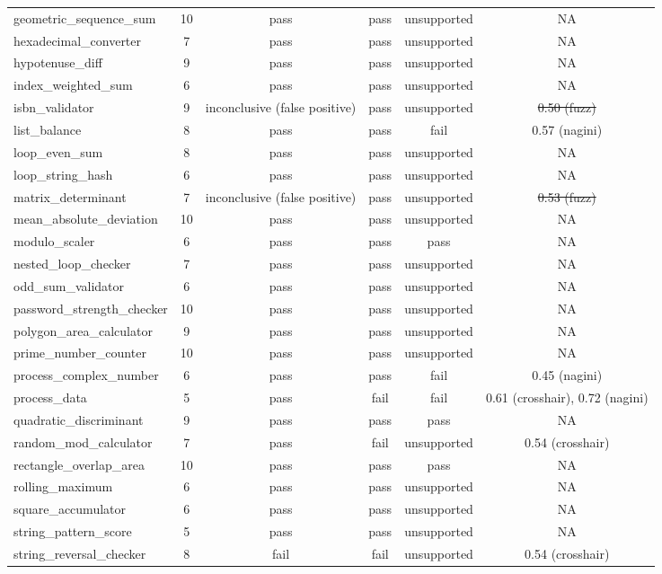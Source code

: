 \documentclass[8pt]{extarticle}
\begin{document}
\begin{longtable}{|l|c|c|c|c|c|}
geometric\_sequence\_sum & 10 & pass & pass & unsupported & NA \\
hexadecimal\_converter & 7 & pass & pass & unsupported & NA \\
hypotenuse\_diff & 9 & pass & pass & unsupported & NA \\
index\_weighted\_sum & 6 & pass & pass & unsupported & NA \\
isbn\_validator & 9 & inconclusive (false positive) & pass & unsupported & \st{0.50 (fuzz)} \\
list\_balance & 8 & pass & pass & fail & 0.57 (nagini) \\
loop\_even\_sum & 8 & pass & pass & unsupported & NA \\
loop\_string\_hash & 6 & pass & pass & unsupported & NA \\
matrix\_determinant & 7 & inconclusive (false positive) & pass & unsupported & \st{0.53 (fuzz)} \\
mean\_absolute\_deviation & 10 & pass & pass & unsupported & NA \\
modulo\_scaler & 6 & pass & pass & pass & NA \\
nested\_loop\_checker & 7 & pass & pass & unsupported & NA \\
odd\_sum\_validator & 6 & pass & pass & unsupported & NA \\
password\_strength\_checker & 10 & pass & pass & unsupported & NA \\
polygon\_area\_calculator & 9 & pass & pass & unsupported & NA \\
prime\_number\_counter & 10 & pass & pass & unsupported & NA \\
process\_complex\_number & 6 & pass & pass & fail & 0.45 (nagini) \\
process\_data & 5 & pass & fail & fail & 0.61 (crosshair), 0.72 (nagini) \\
quadratic\_discriminant & 9 & pass & pass & pass & NA \\
random\_mod\_calculator & 7 & pass & fail & unsupported & 0.54 (crosshair) \\
rectangle\_overlap\_area & 10 & pass & pass & pass & NA \\
rolling\_maximum & 6 & pass & pass & unsupported & NA \\
square\_accumulator & 6 & pass & pass & unsupported & NA \\
string\_pattern\_score & 5 & pass & pass & unsupported & NA \\
string\_reversal\_checker & 8 & fail & fail & unsupported & 0.54 (crosshair) \\

\end{longtable}
\end{document}
